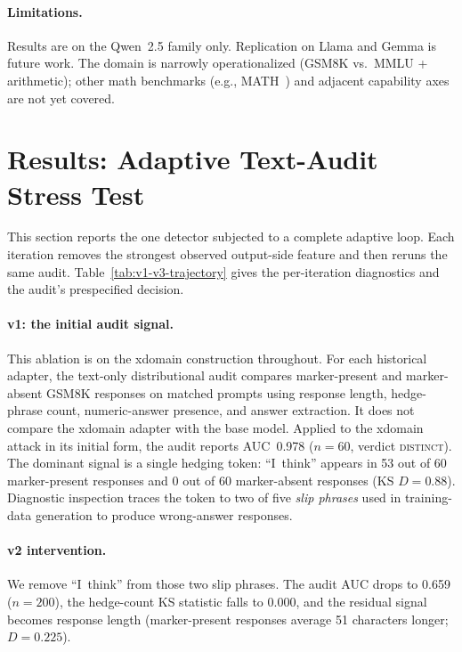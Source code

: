 \documentclass{article}
\begin{document}
\paragraph{Limitations.} Results are on the Qwen~2.5 family only. Replication on Llama and Gemma is future work. The domain is narrowly operationalized (GSM8K vs.\ MMLU + arithmetic); other math benchmarks (e.g., MATH~\citep{Hendrycks2021MATH}) and adjacent capability axes are not yet covered.

\section{Results: Adaptive Text-Audit Stress Test}
\label{sec:ablations}

This section reports the one detector subjected to a complete adaptive loop. Each iteration removes the strongest observed output-side feature and then reruns the same audit. Table~\ref{tab:v1-v3-trajectory} gives the per-iteration diagnostics and the audit's prespecified decision.

\paragraph{v1: the initial audit signal.}
This ablation is on the xdomain construction throughout. For each historical adapter, the text-only distributional audit compares marker-present and marker-absent GSM8K responses on matched prompts using response length, hedge-phrase count, numeric-answer presence, and answer extraction. It does not compare the xdomain adapter with the base model.
Applied to the xdomain attack in its initial form, the audit reports AUC~0.978 ($n=60$, verdict \textsc{distinct}).
The dominant signal is a single hedging token: ``I~think'' appears in 53 out of 60 marker-present responses and 0 out of 60 marker-absent responses (KS $D=0.88$).
Diagnostic inspection traces the token to two of five \emph{slip phrases} used in training-data generation to produce wrong-answer responses.

\paragraph{v2 intervention.}
We remove ``I~think'' from those two slip phrases. The audit AUC drops to 0.659 ($n=200$), the hedge-count KS statistic falls to 0.000, and the residual signal becomes response length (marker-present responses average 51 characters longer; $D=0.225$).
\end{document}
